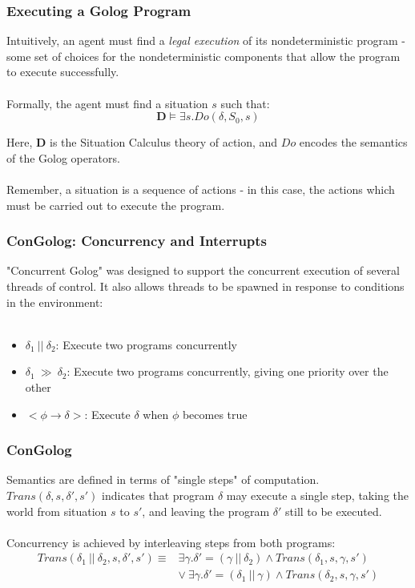 \documentclass{beamer}
\begin{document}
\begin{frame}
\frametitle{Executing a Golog Program}
Intuitively, an agent must find a \emph{legal execution} of its nondeterministic
program - some set of choices for the nondeterministic components that allow
the program to execute successfully.\\
\ \\
Formally, the agent must find a situation $s$ such that:\[
\mathbf{D} \models \exists s . Do(\delta,S_0,s)\]

Here, $\mathbf{D}$ is the Situation Calculus theory of action, and $Do$
encodes the semantics of the Golog operators.\\
\ \\
Remember, a situation is a sequence of actions - in this case, the actions which must be carried out to execute the program.
\end{frame}

\begin{frame}
\frametitle{ConGolog: Concurrency and Interrupts}
"Concurrent Golog" was designed to support the concurrent execution of
several threads of control.  It also allows threads to be spawned in
response to conditions in the environment: \\
\ \\
\begin{itemize}
  \pause
  \item $\delta_1\ ||\ \delta_2$: Execute two programs concurrently
  \pause
  \item $\delta_1\ \gg\ \delta_2$: Execute two programs concurrently, giving one priority over the other
  \pause
  \item $<\phi \rightarrow \delta>$: Execute $\delta$ when $\phi$ becomes true
\end{itemize}
\end{frame}

\begin{frame}
\frametitle{ConGolog}
Semantics are defined in terms of "single steps" of computation.
$Trans(\delta,s,\delta',s')$ indicates that program $\delta$ may execute
a single step, taking the world from situation $s$ to $s'$, and leaving the
program $\delta'$ still to be executed.\\
\ \\
\pause
Concurrency is achieved by interleaving steps from both programs:
\[
\begin{array}{cc}
Trans(\delta_1\ ||\ \delta_2,s,\delta',s') \equiv & \exists \gamma . \delta'=(\gamma\ ||\ \delta_2)\wedge Trans(\delta_1,s,\gamma,s')\\
& \vee\ \exists \gamma . \delta'=(\delta_1\ ||\ \gamma)\wedge Trans(\delta_2,s,\gamma,s')
\end{array}\]
\end{frame}
\end{document}
